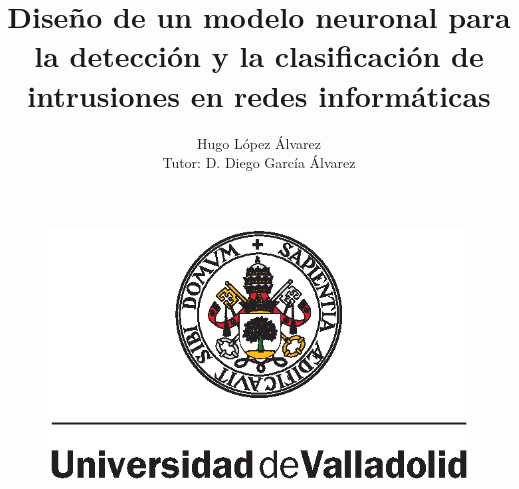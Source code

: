 \title{Diseño de un modelo neuronal para la detección y la clasificación de intrusiones en redes informáticas}
\author{Hugo López Álvarez \\ Tutor: D. Diego García Álvarez
}
\begin{frame}
    \titlepage
    \begin{figure}[H]
        \begin{center}
            \includegraphics[width=0.25\linewidth]{img/uva.eps}
        \end{center}
    \end{figure}
\end{frame}
